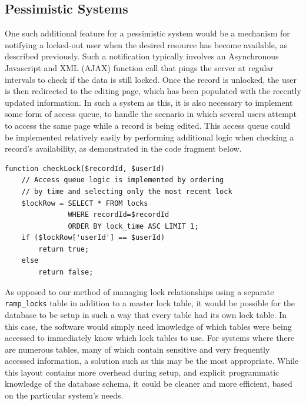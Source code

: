 \documentclass[12pt]{article}
\newcommand{\code}[1]{\texttt{#1}}
\begin{document}
\subsection{Pessimistic Systems}
One such additional feature for a pessimistic system would be a mechanism for notifying a locked-out user when the desired resource has become available, as described previously. Such a notification typically involves an Asynchronous Javascript and XML (AJAX) function call that pings the server at regular intervals to check if the data is still locked. Once the record is unlocked, the user is then redirected to the editing page, which has been populated with the recently updated information. In such a system as this, it is also necessary to implement some form of access queue, to handle the scenario in which several users attempt to access the same page while a record is being edited. This access queue could be implemented relatively easily by performing additional logic when checking a record's availability, as demonstrated in the code fragment below.

\begin{framed}
\begin{spacing}{1.0}
\begin{verbatim}
function checkLock($recordId, $userId)
    // Access queue logic is implemented by ordering 
    // by time and selecting only the most recent lock
    $lockRow = SELECT * FROM locks
               WHERE recordId=$recordId 
               ORDER BY lock_time ASC LIMIT 1;
    if ($lockRow['userId'] == $userId)
        return true;
    else
        return false;

\end{verbatim}
\end{spacing}
\end{framed}

As opposed to our method of managing lock relationships using a separate \code{ramp\_locks} table in addition to a master lock table, it would be possible for the database to be setup in such a way that every table had its own lock table. In this case, the software would simply need knowledge of which tables were being accessed to immediately know which lock tables to use. For systems where there are numerous tables, many of which contain sensitive and very frequently accessed information, a solution such as this may be the most appropriate. While this layout contains more overhead during setup, and explicit programmatic knowledge of the database schema, it could be cleaner and more efficient, based on the particular system's needs.
\end{document}
